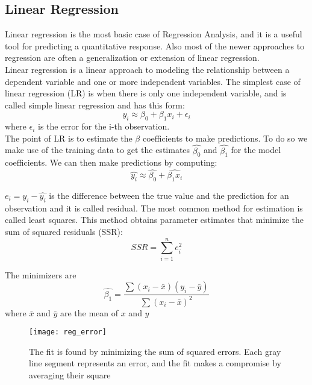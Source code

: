 \subsection{Linear Regression}
Linear regression is the most basic case of Regression Analysis, and it is a useful tool for predicting a quantitative response. Also most of the newer approaches to regression are often a generalization or extension of linear regression. \\
Linear regression is a linear approach to modeling the relationship between a dependent variable and one or more independent variables. The simplest case of linear regression (LR) is when there is only one independent variable, and is called simple linear regression \cite{wiki:lin_reg} and has this form:
\begin{equation}
	y_i \approx \beta_0 + \beta_1x_i + \epsilon_i
\end{equation}
where $\epsilon_i$ is the error for the i-th observation.\\
The point of LR is to estimate the $\beta$ coefficients to make predictions. To do so we make use of the training data to get the estimates $\widehat{\beta_0}$ and $\widehat{\beta_1}$ for the model coefficients. We can then make predictions by computing:
\begin{equation}
\widehat{y_i} \approx \widehat{\beta_0} + \widehat{\beta_1x_i}
\end{equation}

$e_i = y_i - \widehat{y_i}$ is the difference between the true value and the prediction  for an observation and it is called residual. 
The most common method for estimation is called least squares. This method obtains parameter estimates that minimize the sum of squared residuals (SSR):
\begin{equation}
	SSR=\sum _{i=1}^{n}e_{i}^{2}
\end{equation}

The minimizers are
\begin{equation}
	 \widehat{\beta_{1}} = \frac{\sum(x_i - \bar{x})(y_i - \bar{y})}{\sum(x_i - \bar{x})^2}
\end{equation}
where $\bar{x}$ and $\bar{y}$ are the mean of $x$ and $y$

\begin{figure}[H]
	\centering
	\texttt{[image: reg\_error]}
	\caption{The fit is found by minimizing the sum of squared errors. Each gray line segment represents an error, and the fit makes a compromise by averaging their square}
	\label{fig:reg_error}
\end{figure}




